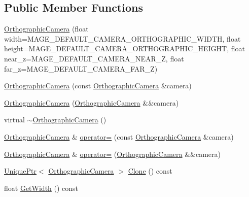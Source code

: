 \subsection*{Public Member Functions}
\begin{DoxyCompactItemize}
\item 
\hyperlink{classmage_1_1_orthographic_camera_a4a9c362b0c1cb90608b699deb3ae8b23}{Orthographic\+Camera} (float width=M\+A\+G\+E\+\_\+\+D\+E\+F\+A\+U\+L\+T\+\_\+\+C\+A\+M\+E\+R\+A\+\_\+\+O\+R\+T\+H\+O\+G\+R\+A\+P\+H\+I\+C\+\_\+\+W\+I\+D\+TH, float height=M\+A\+G\+E\+\_\+\+D\+E\+F\+A\+U\+L\+T\+\_\+\+C\+A\+M\+E\+R\+A\+\_\+\+O\+R\+T\+H\+O\+G\+R\+A\+P\+H\+I\+C\+\_\+\+H\+E\+I\+G\+HT, float near\+\_\+z=M\+A\+G\+E\+\_\+\+D\+E\+F\+A\+U\+L\+T\+\_\+\+C\+A\+M\+E\+R\+A\+\_\+\+N\+E\+A\+R\+\_\+Z, float far\+\_\+z=M\+A\+G\+E\+\_\+\+D\+E\+F\+A\+U\+L\+T\+\_\+\+C\+A\+M\+E\+R\+A\+\_\+\+F\+A\+R\+\_\+Z)
\item 
\hyperlink{classmage_1_1_orthographic_camera_aad12a2901577a187bb53e4c2e2f5a658}{Orthographic\+Camera} (const \hyperlink{classmage_1_1_orthographic_camera}{Orthographic\+Camera} \&camera)
\item 
\hyperlink{classmage_1_1_orthographic_camera_ac7b6bd4cb086403e130e5deaaa16046d}{Orthographic\+Camera} (\hyperlink{classmage_1_1_orthographic_camera}{Orthographic\+Camera} \&\&camera)
\item 
virtual \hyperlink{classmage_1_1_orthographic_camera_ac7d1f4ce12a5d0a2539b610f14f59304}{$\sim$\+Orthographic\+Camera} ()
\item 
\hyperlink{classmage_1_1_orthographic_camera}{Orthographic\+Camera} \& \hyperlink{classmage_1_1_orthographic_camera_ac4a319517ed3b9708028e555660b23aa}{operator=} (const \hyperlink{classmage_1_1_orthographic_camera}{Orthographic\+Camera} \&camera)
\item 
\hyperlink{classmage_1_1_orthographic_camera}{Orthographic\+Camera} \& \hyperlink{classmage_1_1_orthographic_camera_a7fc303921e07ae18dd6fb7e9b7812847}{operator=} (\hyperlink{classmage_1_1_orthographic_camera}{Orthographic\+Camera} \&\&camera)
\item 
\hyperlink{namespacemage_a8c307fbcc33bce9b7f2aa4c26c3b95cf}{Unique\+Ptr}$<$ \hyperlink{classmage_1_1_orthographic_camera}{Orthographic\+Camera} $>$ \hyperlink{classmage_1_1_orthographic_camera_a873f0a715743a7dc104935995696dd33}{Clone} () const
\item 
float \hyperlink{classmage_1_1_orthographic_camera_ac8daeca630e0f4503354e3eede7ead5c}{Get\+Width} () const
\item 

\end{DoxyCompactItemize}
